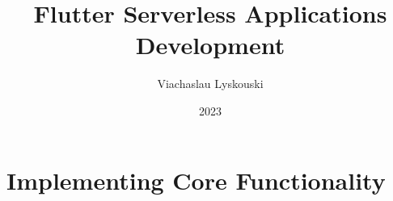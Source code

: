 \documentclass[12pt, a4paper, twoside]{extreport}
\author{Viachaslau Lyskouski}
\title{Flutter Serverless Applications Development}
\date{2023}
\begin{document}


\maketitle

%

\tableofcontents



%



\section{Implementing Core Functionality}



\thispagestyle{empty}



~
\end{document}
